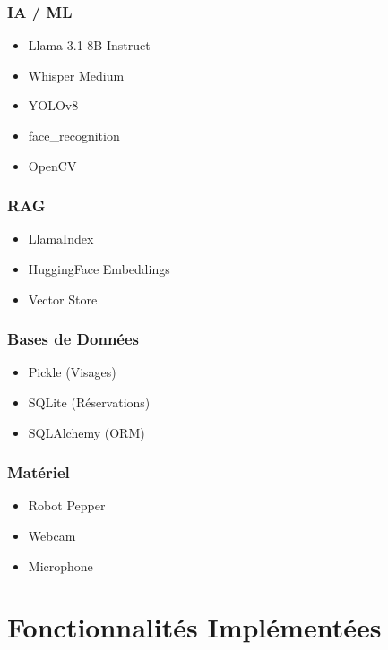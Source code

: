 \documentclass[12pt,a4paper]{article}
\begin{document}
\subsubsection{IA / ML}
\begin{itemize}
    \item Llama 3.1-8B-Instruct
    \item Whisper Medium
    \item YOLOv8
    \item face\_recognition
    \item OpenCV
\end{itemize}

\subsubsection{RAG}
\begin{itemize}
    \item LlamaIndex
    \item HuggingFace Embeddings
    \item Vector Store
\end{itemize}

\subsubsection{Bases de Données}
\begin{itemize}
    \item Pickle (Visages)
    \item SQLite (Réservations)
    \item SQLAlchemy (ORM)
\end{itemize}

\subsubsection{Matériel}
\begin{itemize}
    \item Robot Pepper
    \item Webcam
    \item Microphone
\end{itemize}


\section{Fonctionnalités Implémentées}
\end{document}

